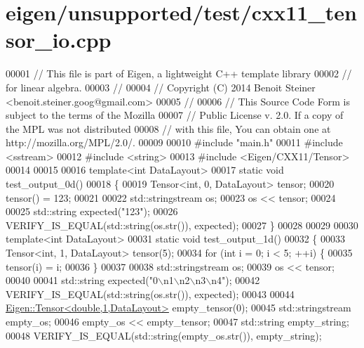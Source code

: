 \hypertarget{eigen_2unsupported_2test_2cxx11__tensor__io_8cpp_source}{}\section{eigen/unsupported/test/cxx11\+\_\+tensor\+\_\+io.cpp}
\label{eigen_2unsupported_2test_2cxx11__tensor__io_8cpp_source}

\begin{DoxyCode}
00001 \textcolor{comment}{// This file is part of Eigen, a lightweight C++ template library}
00002 \textcolor{comment}{// for linear algebra.}
00003 \textcolor{comment}{//}
00004 \textcolor{comment}{// Copyright (C) 2014 Benoit Steiner <benoit.steiner.goog@gmail.com>}
00005 \textcolor{comment}{//}
00006 \textcolor{comment}{// This Source Code Form is subject to the terms of the Mozilla}
00007 \textcolor{comment}{// Public License v. 2.0. If a copy of the MPL was not distributed}
00008 \textcolor{comment}{// with this file, You can obtain one at http://mozilla.org/MPL/2.0/.}
00009 
00010 \textcolor{preprocessor}{#include "main.h"}
00011 \textcolor{preprocessor}{#include <sstream>}
00012 \textcolor{preprocessor}{#include <string>}
00013 \textcolor{preprocessor}{#include <Eigen/CXX11/Tensor>}
00014 
00015 
00016 \textcolor{keyword}{template}<\textcolor{keywordtype}{int} DataLayout>
00017 \textcolor{keyword}{static} \textcolor{keywordtype}{void} test\_output\_0d()
00018 \{
00019   Tensor<int, 0, DataLayout> tensor;
00020   tensor() = 123;
00021 
00022   std::stringstream os;
00023   os << tensor;
00024 
00025   std::string expected(\textcolor{stringliteral}{"123"});
00026   VERIFY\_IS\_EQUAL(std::string(os.str()), expected);
00027 \}
00028 
00029 
00030 \textcolor{keyword}{template}<\textcolor{keywordtype}{int} DataLayout>
00031 \textcolor{keyword}{static} \textcolor{keywordtype}{void} test\_output\_1d()
00032 \{
00033   Tensor<int, 1, DataLayout> tensor(5);
00034   \textcolor{keywordflow}{for} (\textcolor{keywordtype}{int} i = 0; i < 5; ++i) \{
00035     tensor(i) = i;
00036   \}
00037 
00038   std::stringstream os;
00039   os << tensor;
00040 
00041   std::string expected(\textcolor{stringliteral}{"0\(\backslash\)n1\(\backslash\)n2\(\backslash\)n3\(\backslash\)n4"});
00042   VERIFY\_IS\_EQUAL(std::string(os.str()), expected);
00043 
00044   \hyperlink{class_eigen_1_1_tensor}{Eigen::Tensor<double,1,DataLayout>} empty\_tensor(0);
00045   std::stringstream empty\_os;
00046   empty\_os << empty\_tensor;
00047   std::string empty\_string;
00048   VERIFY\_IS\_EQUAL(std::string(empty\_os.str()), empty\_string);

\end{DoxyCode}
